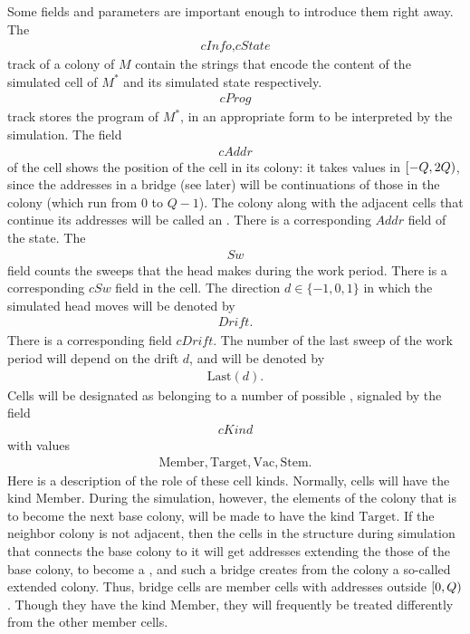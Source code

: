 \documentclass[12pt]{memoir}
\newcommand{\fld}[1]{\ensuremath{\textit{#1}}}
\newcommand{\Addr}{\fld{Addr}}
\newcommand{\cAddr}{\fld{cAddr}}
\newcommand{\Drift}{\fld{Drift}}
\newcommand{\cDrift}{\fld{cDrift}}
\newcommand{\cInfo}{\fld{cInfo}}
\newcommand{\cKind}{\fld{cKind}}
\newcommand{\cProg}{\fld{cProg}}
\newcommand{\cState}{\fld{cState}}
\newcommand{\Sweep}{\fld{Sw}}
\newcommand{\cSweep}{\fld{cSw}}
\newcommand{\Last}{\mathrm{Last}}
\newcommand{\Member}{\mathrm{Member}}
\newcommand{\Target}{\mathrm{Target}}
\newcommand{\Stem}{\mathrm{Stem}}
\newcommand{\Vacant}{\mathrm{Vac}}
\begin{document}
Some fields and parameters are important enough to introduce them right away.
The 
\begin{align*}
   \cInfo,\cState
 \end{align*}
track of a colony of \( M \)
contain the strings that encode the content of the simulated cell of \( M^{*} \) and
its simulated state respectively.
\begin{align*}
 \cProg
 \end{align*}
track stores the program of \( M^{*} \), in an appropriate form 
to be interpreted by the simulation.
The field 
 \begin{align*}
  \cAddr
 \end{align*}
of the cell shows the position of the cell in its colony:
it takes values in \( [-Q,2Q) \), since the addresses in a bridge (see later)
will be continuations of those in the colony (which run from \( 0 \) to \( Q-1 \)).
The colony along with the adjacent cells that continue its addresses will be called
an .
There is a corresponding \( \Addr \) field of the state.
The
 \begin{align*}
 \Sweep
 \end{align*}
field counts the sweeps that the head makes during the work period.
There is a corresponding \( \cSweep \) field in the cell.
The direction \( d\in\{-1,0,1\} \) in which the 
simulated head moves will be denoted by
 \begin{align*}
   \Drift.
 \end{align*}
There is a corresponding field \( \cDrift \).
The number of the last sweep of the work period will depend on the drift \( d \), 
and will be denoted by 
\begin{align}\label{eq:Last}
   \Last(d).
 \end{align}
Cells will be designated as belonging to a number of possible , signaled by the
field 
\begin{align*}
     \cKind
 \end{align*}
with values
       \begin{align*}
          \Member, \Target, \Vacant, \Stem.
       \end{align*}
Here is a description of the role of these cell kinds.
Normally, cells will have the kind \( \Member \).
During the simulation, however, the elements of the colony that is to become
the next base colony, will be made to have the kind \( \Target \).
If the neighbor colony 
is not adjacent, then the cells in the structure during simulation
that connects the base colony to it will get addresses extending the those of the base
colony,  to become a , and such a bridge creates from the colony a
so-called extended colony.
Thus, bridge cells are member cells with addresses outside \( [0,Q) \).
Though they have the kind \( \Member \), they will frequently be treated
differently from the other member cells.
\end{document}
